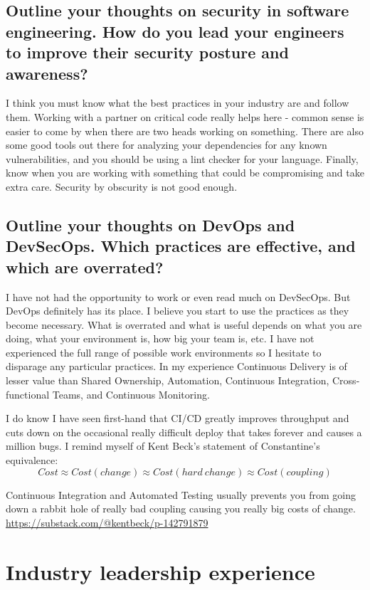 \documentclass[letter,12pt]{article}
\begin{document}
\subsection{Outline your thoughts on security in software engineering. How do you lead your engineers to improve their security posture and awareness?}
I think you must know what the best practices in your industry are and follow them. Working with a partner on critical code really helps here - common sense is easier to come by when there are two heads working on something. There are also some good tools out there for analyzing your dependencies for any known vulnerabilities, and you should be using a lint checker for your language. Finally, know when you are working with something that could be compromising and take extra care. Security by obscurity is not good enough.

\subsection{Outline your thoughts on DevOps and DevSecOps. Which practices are effective, and which are overrated?}
I have not had the opportunity to work or even read much on DevSecOps. But DevOps definitely has its place. I believe you start to use the practices as they become necessary. What is overrated and what is useful depends on what you are doing, what your environment is, how big your team is, etc. I have not experienced the full range of possible work environments so I hesitate to disparage any particular practices. In my experience Continuous Delivery is of lesser value than Shared Ownership, Automation, Continuous Integration, Cross-functional Teams, and Continuous Monitoring.

I do know I have seen first-hand that CI/CD greatly improves throughput and cuts down on the occasional really difficult deploy that takes forever and causes a million bugs. I remind myself of Kent Beck's statement of Constantine's equivalence:
\begin{equation}
  Cost \approx Cost(change) \approx Cost(hard\ change) \approx Cost(coupling)
\end{equation}

Continuous Integration and Automated Testing usually prevents you from going down a rabbit hole of really bad coupling causing you really big costs of change. \href{https://substack.com/@kentbeck/p-142791879}{https://substack.com/@kentbeck/p-142791879}

\section{Industry leadership experience}
\end{document}
